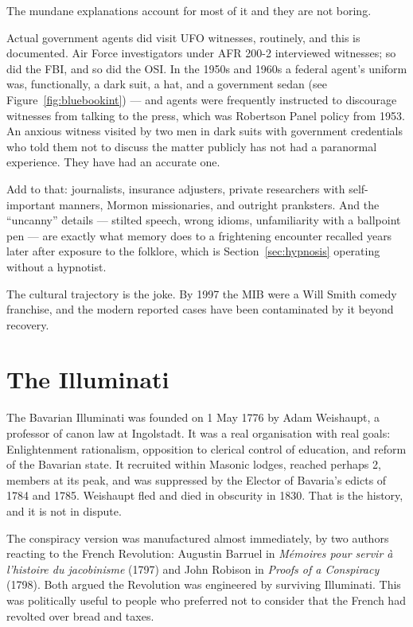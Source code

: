 The mundane explanations account for most of it and they are not boring.

Actual government agents did visit UFO witnesses, routinely, and this is documented. Air Force
investigators under AFR 200-2 interviewed witnesses; so did the FBI, and so did the OSI. In the
1950s and 1960s a federal agent's uniform was, functionally, a dark suit, a hat, and a government sedan (see Figure~\ref{fig:bluebookint}) --- and agents were frequently instructed to discourage witnesses from talking
to the press, which was Robertson Panel policy from 1953. An anxious witness visited by two men
in dark suits with government credentials who told them not to discuss the matter publicly has
not had a paranormal experience. They have had an accurate one.

Add to that: journalists, insurance adjusters, private researchers with self-important manners,
Mormon missionaries, and outright pranksters. And the ``uncanny'' details --- stilted speech,
wrong idioms, unfamiliarity with a ballpoint pen --- are exactly what memory does to a
frightening encounter recalled years later after exposure to the folklore, which is
Section~\ref{sec:hypnosis} operating without a hypnotist.

The cultural trajectory is the joke. By 1997 the MIB were a Will Smith comedy franchise, and
the modern reported cases have been contaminated by it beyond recovery.

\section{The Illuminati}\label{sec:illuminati}

The Bavarian Illuminati was founded on 1 May 1776 by Adam Weishaupt, a professor of canon law
at Ingolstadt. It was a real organisation with real goals: Enlightenment rationalism, opposition
to clerical control of education, and reform of the Bavarian state. It recruited within Masonic
lodges, reached perhaps 2, members at its peak, and was suppressed by the Elector of
Bavaria's edicts of 1784 and 1785. Weishaupt fled and died in obscurity in 1830. That is the
history, and it is not in dispute.

The conspiracy version was manufactured almost immediately, by two authors reacting to the
French Revolution: Augustin Barruel in \emph{M\'emoires pour servir \`a l'histoire du
jacobinisme} (1797) and John Robison in \emph{Proofs of a Conspiracy} (1798). Both argued the
Revolution was engineered by surviving Illuminati. This was politically useful to people who
preferred not to consider that the French had revolted over bread and taxes.

